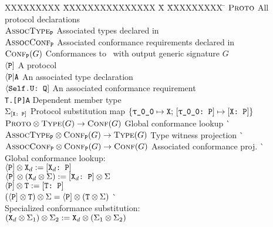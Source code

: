 \documentclass[../generics]{subfiles}
\begin{document}
\begin{tabbing}
XXXXXXXXX \= XXXXXXXXXXXXXXX \= X \= XXXXXXXXX \= \kill
{}$\textsc{Proto}$ \> All protocol declarations\\
$\textsc{AssocType}_{\texttt{P}}$ \> Associated types declared in \tP\\
$\textsc{AssocConf}_{\texttt{P}}$ \> Associated conformance requirements declared in \tP\\
$\textsc{Conf}_{\texttt{P}}({G})$ \> Conformances to \tP\ with output generic signature $G$\\[\medskipamount]
$\langle\texttt{P}]$ \> A protocol\\
$\langle\texttt{P}|\texttt{A}$ \> An associated type declaration\\
$\langle\texttt{Self.U:~Q}]$ \> An associated conformance requirement\\
\texttt{T.[P]A} \> Dependent member type \\
$\Sigma_{[\texttt{X:~P}]}$ \> Protocol substitution map $\SubstMapC{\SubstType{\rT}{X}}{\SubstConf{\rT}{X}{P}}$\\[\bigskipamount]
$\textsc{Proto}\otimes\textsc{Type}({G})\rightarrow\textsc{Conf}({G})$ \> \> Global conformance lookup \` \\
$\textsc{AssocType}_{\texttt{P}}\otimes\textsc{Conf}_{\texttt{P}}({G})\rightarrow\textsc{Type}({G})$ \> \> Type witness projection \` \\
$\textsc{AssocConf}_{\texttt{P}}\otimes\textsc{Conf}_{\texttt{P}}({G})\rightarrow\textsc{Conf}({G})$ \> \> Associated conformance proj. \` \\[\bigskipamount]
Global conformance lookup:\\
\qquad $\langle\texttt{P}] \otimes \texttt{X}_d := [\texttt{$\texttt{X}_d$:~P}]$\\
\qquad $\langle\texttt{P}] \otimes (\texttt{X}_d \otimes \Sigma) := [\texttt{$\texttt{X}_d$:~P}] \otimes \Sigma$\\
\qquad $\langle\texttt{P}] \otimes \texttt{T} := [\texttt{T:~P}]$\\
\qquad $(\langle\texttt{P}] \otimes \texttt{T}) \otimes \Sigma = \langle\texttt{P}] \otimes (\texttt{T} \otimes \Sigma)$ \` \\[\medskipamount]
Specialized conformance substitution:\\
\qquad $(\texttt{X}_d \otimes \Sigma_1) \otimes \Sigma_2 := \texttt{X}_d \otimes (\Sigma_1 \otimes \Sigma_2)$\\[\medskipamount]

\end{tabbing}
\end{document}
